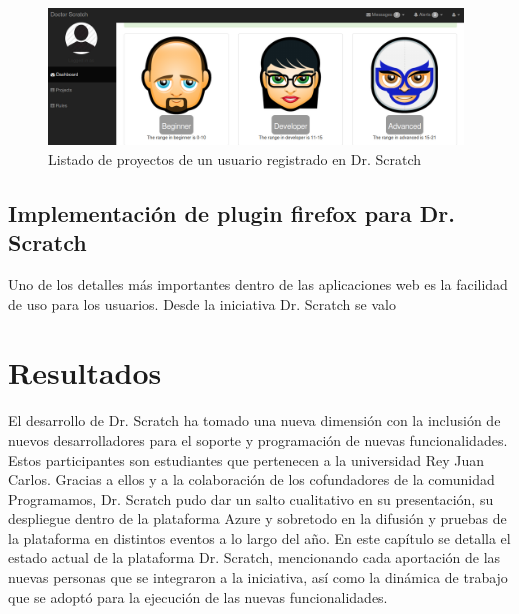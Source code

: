 \documentclass[a4paper, 12pt]{book}
\begin{document}
\begin{figure}
	\graphicspath{{img/}}
  \includegraphics[bb=0 0 800 600, width=11cm, keepaspectratio]{niveles.png}
	\caption{Listado de proyectos de un usuario registrado en Dr. Scratch}
  \label{figura:foro_hilos}
\end{figure}


\section{Implementación de plugin firefox para Dr. Scratch}
\label{sec:servidor}

Uno de los detalles más importantes dentro de las aplicaciones web es la facilidad de 
uso para los usuarios. Desde la iniciativa Dr. Scratch se valo





\cleardoublepage
\chapter{Resultados}

El desarrollo de Dr. Scratch ha tomado una nueva dimensión con la inclusión de nuevos 
desarrolladores para el soporte y programación de nuevas funcionalidades. Estos 
participantes son estudiantes que pertenecen a la universidad Rey Juan Carlos. Gracias
a ellos y a la colaboración de los cofundadores de la comunidad Programamos,
Dr. Scratch pudo dar un salto cualitativo en su presentación, su despliegue dentro 
de la plataforma Azure y sobretodo en la difusión y pruebas de la plataforma en 
distintos eventos a lo largo del año. En este capítulo se detalla el estado actual de 
la plataforma Dr. Scratch, mencionando cada aportación de las nuevas personas que se 
integraron a la iniciativa, así como la dinámica de trabajo que se adoptó para la 
ejecución de las nuevas funcionalidades.
\end{document}
